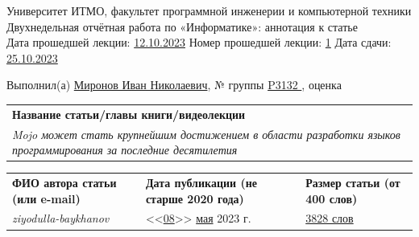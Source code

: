 \documentclass[12pt]{article}
\begin{document}
\begin{center}
\quad Университет ИТМО, факультет программной инженерии и компьютерной техники \\
\quad Двухнедельная отчётная работа по «Информатике»: аннотация к статье\\
\quad Дата прошедшей лекции: \underline{12.10.2023} 	Номер прошедшей лекции: \underline{1}	Дата сдачи: \underline{25.10.2023}

\bigskip

\quad Выполнил(а) \underline{Миронов Иван Николаевич}, № группы \underline{ P3132 }, оценка \underline{\hspace{2cm}}


\end{center}

\begin{tabularx}{\textwidth} { 
  | >{\raggedright\arraybackslash}X|}
    \hline
\textbf{Название статьи/главы книги/видеолекции}\\
    \textit{Mojo может стать крупнейшим достижением в области разработки языков программирования за последние десятилетия}\\
    \hline
\end{tabularx}

\begin{tabularx}{\textwidth} 
{ 
| >{\centering\arraybackslash}X
| >{\centering\arraybackslash}X
| >{\centering\arraybackslash}X 
|}
    \textbf{ФИО автора статьи \quad (или e-mail)} & \textbf{Дата публикации \qquad\qquad (не старше 2020 года)} & \textbf{Размер статьи \qquad\qquad (от 400 слов)} \\
     \textit{ziyodulla-baykhanov} & <<\underline{08}>> \underline{мая} 2023 г. & \underline{3828 слов} \\
    \hline
\end{tabularx}
\end{document}
